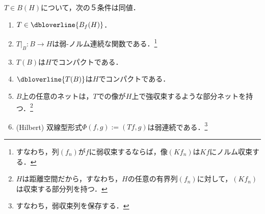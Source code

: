 \documentclass[uplatex,dvipdfmx]{jsreport}
\begin{document}
\begin{theorem}
    $T\in B(H)$について，次の５条件は同値．
    \begin{enumerate}
        \item $T\in\dbloverline{B_f(H)}$．
        \item $T|_B:B\to H$は弱-ノルム連続な関数である．\footnote{すなわち，列$(f_n)$が$f$に弱収束するならば，像$(Kf_n)$は$Kf$にノルム収束する．}
        \item $T(B)$は$H$でコンパクトである．
        \item $\dbloverline{T(B)}$は$H$でコンパクトである．
        \item $B$上の任意のネットは，$T$での像が$H$上で強収束するような部分ネットを持つ．\footnote{$H$は距離空間だから，すなわち，$H$の任意の有界列$(f_n)$に対して，$(Kf_n)$は収束する部分列を持つ．}
        \item (Hilbert) 双線型形式$\Phi(f,g):=(Tf,g)$は弱連続である．\footnote{すなわち，弱収束列を保存する．}
    \end{enumerate}
\end{theorem}
\end{document}
